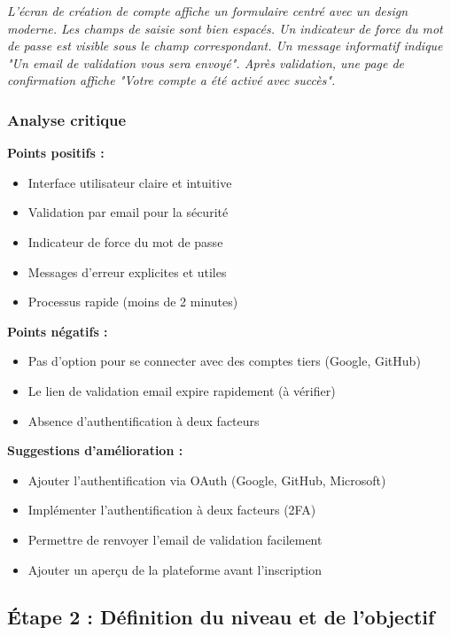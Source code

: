 \documentclass[12pt,a4paper]{article}
\begin{document}
\textit{L'écran de création de compte affiche un formulaire centré avec un design moderne. Les champs de saisie sont bien espacés. Un indicateur de force du mot de passe est visible sous le champ correspondant. Un message informatif indique "Un email de validation vous sera envoyé". Après validation, une page de confirmation affiche "Votre compte a été activé avec succès".}

\subsubsection{Analyse critique}

\textbf{Points positifs :}
\begin{itemize}
    \item Interface utilisateur claire et intuitive
    \item Validation par email pour la sécurité
    \item Indicateur de force du mot de passe
    \item Messages d'erreur explicites et utiles
    \item Processus rapide (moins de 2 minutes)
\end{itemize}

\textbf{Points négatifs :}
\begin{itemize}
    \item Pas d'option pour se connecter avec des comptes tiers (Google, GitHub)
    \item Le lien de validation email expire rapidement (à vérifier)
    \item Absence d'authentification à deux facteurs
\end{itemize}

\textbf{Suggestions d'amélioration :}
\begin{itemize}
    \item Ajouter l'authentification via OAuth (Google, GitHub, Microsoft)
    \item Implémenter l'authentification à deux facteurs (2FA)
    \item Permettre de renvoyer l'email de validation facilement
    \item Ajouter un aperçu de la plateforme avant l'inscription
\end{itemize}

\subsection{Étape 2 : Définition du niveau et de l'objectif}
\end{document}
